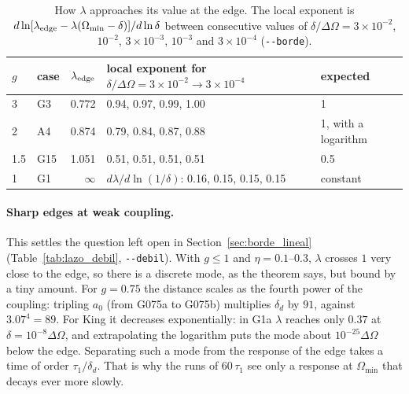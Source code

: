\documentclass[11pt,a4paper]{article}
\begin{document}
\begin{table}[!htbp]
\centering
\small
\begin{tabular}{llrll}
\toprule
$g$ & case & $\lambda_{\rm edge}$ & local exponent for $\delta/\Delta\Omega=3\times10^{-2}\to3\times10^{-4}$ & expected\\
\midrule
3 & G3 & 0.772 & 0.94, 0.97, 0.99, 1.00 & 1\\
2 & A4 & 0.874 & 0.79, 0.84, 0.87, 0.88 & 1, with a logarithm\\
1.5 & G15 & 1.051 & 0.51, 0.51, 0.51, 0.51 & 0.5\\
1 & G1 & $\infty$ & $d\lambda/d\ln(1/\delta)$: 0.16, 0.15, 0.15, 0.15 & constant\\
\bottomrule
\end{tabular}
\caption{How $\lambda$ approaches its value at the edge. The local exponent is
$d\ln[\lambda_{\rm edge}-\lambda(\Omega_{\min}-\delta)]/d\ln\delta$ between consecutive values of
$\delta/\Delta\Omega=3\times10^{-2}$, $10^{-2}$, $3\times10^{-3}$, $10^{-3}$ and $3\times10^{-4}$ (\texttt{-{}-borde}).}
\label{tab:lazo_borde}
\end{table}

\paragraph{Sharp edges at weak coupling.} This settles the question left open in
Section~\ref{sec:borde_lineal} (Table~\ref{tab:lazo_debil}, \texttt{-{}-debil}). With $g\le1$ and
$\eta=0.1$--$0.3$, $\lambda$ crosses $1$ very close to the edge, so there is a discrete mode, as the
theorem says, but bound by a tiny amount. For $g=0.75$ the distance scales as the fourth power
of the coupling: tripling $a_0$ (from G075a to G075b) multiplies $\delta_d$ by $91$, against
$3.07^4=89$. For King it decreases exponentially: in G1a $\lambda$ reaches only $0.37$ at
$\delta=10^{-8}\Delta\Omega$, and extrapolating the logarithm puts the mode about $10^{-25}\Delta\Omega$ below the
edge. Separating such a mode from the response of the edge takes a time of order $\tau_1/\delta_d$.
That is why the runs of $60\,\tau_1$ see only a response at $\Omega_{\min}$ that decays ever more
slowly.
\end{document}
